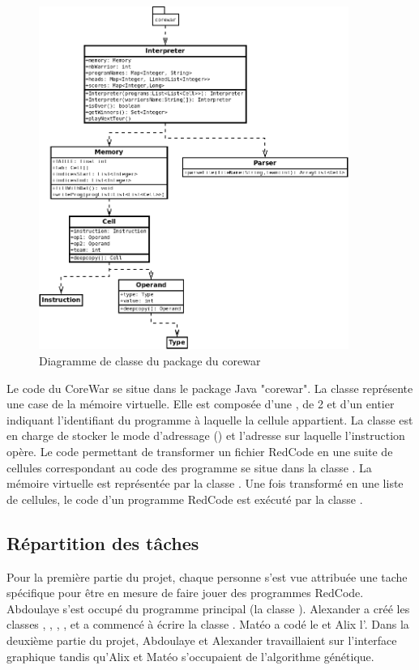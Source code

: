 \documentclass[a4paper,12pt]{article} %
\begin{document}
\begin{figure}[!ht]
	\centering
	\includegraphics[width=0.9\textwidth]{images/diagram-corewar}
	\caption{Diagramme de classe du package du corewar}
\end{figure}

Le code du CoreWar se situe dans le package Java "corewar". La classe  représente une case de la mémoire virtuelle. Elle est composée d'une , de 2  et d'un entier indiquant l'identifiant du programme à laquelle la cellule appartient. La classe  est en charge de stocker le mode d'adressage () et l'adresse sur laquelle l'instruction opère. Le code permettant de transformer un fichier RedCode en une suite de cellules correspondant au code des programme se situe dans la classe . La mémoire virtuelle est représentée par la classe . Une fois transformé en une liste de cellules, le code d'un programme RedCode est exécuté par la classe .

\subsection{Répartition des tâches}
Pour la première partie du projet, chaque personne s'est vue attribuée une tache spécifique pour être en mesure de faire jouer des programmes RedCode. Abdoulaye s'est occupé du programme principal (la classe ). Alexander a créé les classes , , , , et a commencé à écrire la classe . Matéo a codé le  et Alix l'.
Dans la deuxième partie du projet, Abdoulaye et Alexander travaillaient sur l'interface graphique tandis qu'Alix et Matéo s'occupaient de l'algorithme génétique.
\end{document}
